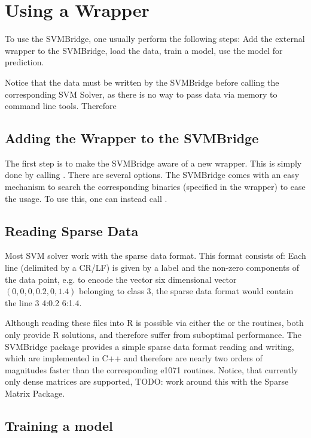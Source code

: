 \documentclass[article, shortnames]{jss}
\begin{document}
\section{Using a Wrapper}

To use the SVMBridge, one usually perform the following steps:
Add the external wrapper to the SVMBridge, load the data, train a model, use the
model for prediction.

Notice that the data must be written by the SVMBridge before calling 
the corresponding SVM Solver, as there is no way to pass data via memory
to command line tools. Therefore 


\subsection{Adding the Wrapper to the SVMBridge}

The first step is to make the SVMBridge aware of a new wrapper.
This is simply done by calling .
There are several options.
The SVMBridge comes with an easy mechanism to search 
the corresponding binaries (specified in the wrapper) to ease
the usage. To use this, one can instead call .



\subsection{Reading Sparse Data}

Most SVM solver work with the sparse data format.
This format consists of:
Each line (delimited by a CR/LF) is given by a label
and the non-zero components of the data point,
e.g. to encode the vector six dimensional vector 
 $ ( 0 , 0 , 0 , 0.2 , 0 , 1.4 ) $
belonging to class $3$, the sparse 
data format would contain the line {3 4:0.2 6:1.4}.

Although reading these files into R is possible via either
the  or the  routines, both only provide R solutions,
and therefore suffer from suboptimal performance.
The SVMBridge package provides a simple sparse data format 
reading and writing, which are implemented in C++ and
therefore are nearly two orders of magnitudes faster than
the corresponding e1071 routines.
Notice, that currently only dense matrices are supported,
TODO: work around this with the Sparse Matrix Package.



\subsection{Training a model}
\end{document}
